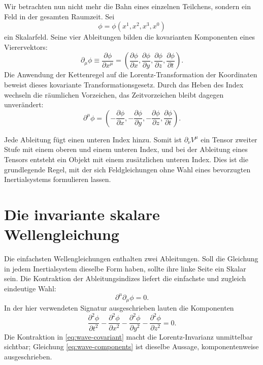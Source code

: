 Wir betrachten nun nicht mehr die Bahn eines einzelnen Teilchens, sondern ein Feld in der gesamten Raumzeit. Sei \begin{equation}
  \phi=\phi(x^1,x^2,x^3,x^0)
\end{equation} ein Skalarfeld. Seine vier Ableitungen bilden die kovarianten Komponenten eines Vierervektors: \begin{equation}
  \partial_\mu\phi
  \equiv\frac{\partial\phi}{\partial x^\mu}
  =\left(
    \frac{\partial\phi}{\partial x},
    \frac{\partial\phi}{\partial y},
    \frac{\partial\phi}{\partial z},
    \frac{\partial\phi}{\partial t}
  \right).
\end{equation} Die Anwendung der Kettenregel auf die Lorentz-Transformation der Koordinaten beweist dieses kovariante Transformationsgesetz. Durch das Heben des Index wechseln die räumlichen Vorzeichen, das Zeitvorzeichen bleibt dagegen unverändert: \begin{equation}
  \partial^\mu\phi
  =\left(
    -\frac{\partial\phi}{\partial x},
    -\frac{\partial\phi}{\partial y},
    -\frac{\partial\phi}{\partial z},
    \frac{\partial\phi}{\partial t}
  \right).
\end{equation}

Jede Ableitung fügt einen unteren Index hinzu. Somit ist \(\partial_\nu V^\mu\) ein Tensor zweiter Stufe mit einem oberen und einem unteren Index, und bei der Ableitung eines Tensors entsteht ein Objekt mit einem zusätzlichen unteren Index. Dies ist die grundlegende Regel, mit der sich Feldgleichungen ohne Wahl eines bevorzugten Inertialsystems formulieren lassen.

\section{Die invariante skalare Wellengleichung}

Die einfachsten Wellengleichungen enthalten zwei Ableitungen. Soll die Gleichung in jedem Inertialsystem dieselbe Form haben, sollte ihre linke Seite ein Skalar sein. Die Kontraktion der Ableitungsindizes liefert die einfachste und zugleich eindeutige Wahl: \begin{equation}
  \boxed{\partial^\mu\partial_\mu\phi=0.}
  \label{eq:wave-covariant}
\end{equation} In der hier verwendeten Signatur ausgeschrieben lauten die Komponenten \begin{equation}
  \frac{\partial^2\phi}{\partial t^2}
  -\frac{\partial^2\phi}{\partial x^2}
  -\frac{\partial^2\phi}{\partial y^2}
  -\frac{\partial^2\phi}{\partial z^2}=0.
  \label{eq:wave-components}
\end{equation} Die Kontraktion in \eqref{eq:wave-covariant} macht die Lorentz-Invarianz unmittelbar sichtbar; Gleichung \eqref{eq:wave-components} ist dieselbe Aussage, komponentenweise ausgeschrieben.

